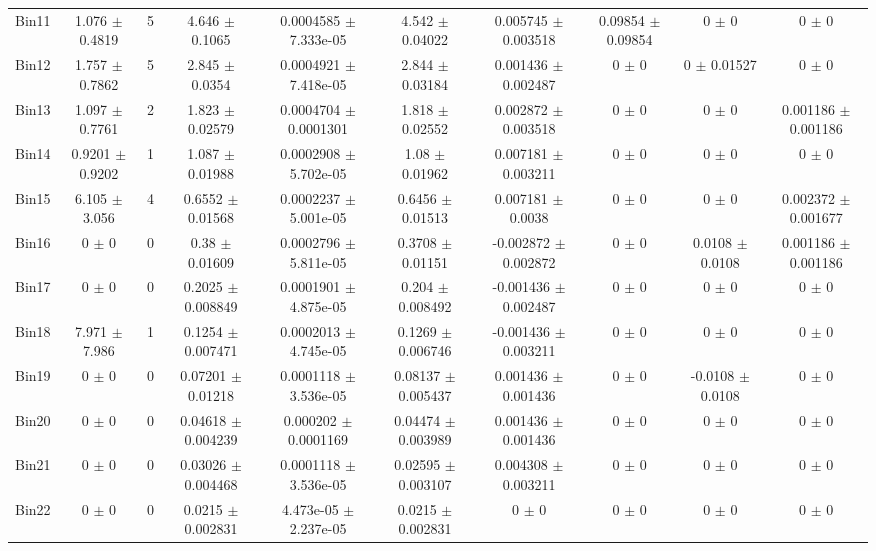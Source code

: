 \begin{tabular}{@{\extracolsep{4pt}}lccccccccc@{}}
     Bin11 & 1.076 $\pm$ 0.4819 & 5 & 4.646 $\pm$ 0.1065 & 0.0004585 $\pm$ 7.333e-05 & 4.542 $\pm$ 0.04022 & 0.005745 $\pm$ 0.003518 & 0.09854 $\pm$ 0.09854 & 0 $\pm$ 0 & 0 $\pm$ 0 \\ 
     Bin12 & 1.757 $\pm$ 0.7862 & 5 & 2.845 $\pm$ 0.0354 & 0.0004921 $\pm$ 7.418e-05 & 2.844 $\pm$ 0.03184 & 0.001436 $\pm$ 0.002487 & 0 $\pm$ 0 & 0 $\pm$ 0.01527 & 0 $\pm$ 0 \\ 
     Bin13 & 1.097 $\pm$ 0.7761 & 2 & 1.823 $\pm$ 0.02579 & 0.0004704 $\pm$ 0.0001301 & 1.818 $\pm$ 0.02552 & 0.002872 $\pm$ 0.003518 & 0 $\pm$ 0 & 0 $\pm$ 0 & 0.001186 $\pm$ 0.001186 \\ 
     Bin14 & 0.9201 $\pm$ 0.9202 & 1 & 1.087 $\pm$ 0.01988 & 0.0002908 $\pm$ 5.702e-05 & 1.08 $\pm$ 0.01962 & 0.007181 $\pm$ 0.003211 & 0 $\pm$ 0 & 0 $\pm$ 0 & 0 $\pm$ 0 \\ 
     Bin15 & 6.105 $\pm$ 3.056 & 4 & 0.6552 $\pm$ 0.01568 & 0.0002237 $\pm$ 5.001e-05 & 0.6456 $\pm$ 0.01513 & 0.007181 $\pm$ 0.0038 & 0 $\pm$ 0 & 0 $\pm$ 0 & 0.002372 $\pm$ 0.001677 \\ 
     Bin16 & 0 $\pm$ 0 & 0 & 0.38 $\pm$ 0.01609 & 0.0002796 $\pm$ 5.811e-05 & 0.3708 $\pm$ 0.01151 & -0.002872 $\pm$ 0.002872 & 0 $\pm$ 0 & 0.0108 $\pm$ 0.0108 & 0.001186 $\pm$ 0.001186 \\ 
     Bin17 & 0 $\pm$ 0 & 0 & 0.2025 $\pm$ 0.008849 & 0.0001901 $\pm$ 4.875e-05 & 0.204 $\pm$ 0.008492 & -0.001436 $\pm$ 0.002487 & 0 $\pm$ 0 & 0 $\pm$ 0 & 0 $\pm$ 0 \\ 
     Bin18 & 7.971 $\pm$ 7.986 & 1 & 0.1254 $\pm$ 0.007471 & 0.0002013 $\pm$ 4.745e-05 & 0.1269 $\pm$ 0.006746 & -0.001436 $\pm$ 0.003211 & 0 $\pm$ 0 & 0 $\pm$ 0 & 0 $\pm$ 0 \\ 
     Bin19 & 0 $\pm$ 0 & 0 & 0.07201 $\pm$ 0.01218 & 0.0001118 $\pm$ 3.536e-05 & 0.08137 $\pm$ 0.005437 & 0.001436 $\pm$ 0.001436 & 0 $\pm$ 0 & -0.0108 $\pm$ 0.0108 & 0 $\pm$ 0 \\ 
     Bin20 & 0 $\pm$ 0 & 0 & 0.04618 $\pm$ 0.004239 & 0.000202 $\pm$ 0.0001169 & 0.04474 $\pm$ 0.003989 & 0.001436 $\pm$ 0.001436 & 0 $\pm$ 0 & 0 $\pm$ 0 & 0 $\pm$ 0 \\ 
     Bin21 & 0 $\pm$ 0 & 0 & 0.03026 $\pm$ 0.004468 & 0.0001118 $\pm$ 3.536e-05 & 0.02595 $\pm$ 0.003107 & 0.004308 $\pm$ 0.003211 & 0 $\pm$ 0 & 0 $\pm$ 0 & 0 $\pm$ 0 \\ 
     Bin22 & 0 $\pm$ 0 & 0 & 0.0215 $\pm$ 0.002831 & 4.473e-05 $\pm$ 2.237e-05 & 0.0215 $\pm$ 0.002831 & 0 $\pm$ 0 & 0 $\pm$ 0 & 0 $\pm$ 0 & 0 $\pm$ 0 \\ 

\end{tabular}
